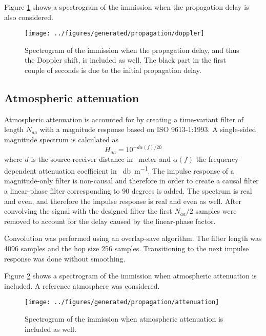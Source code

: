 Figure \ref{fig:implementation:propagation:doppler} shows a spectrogram of the immission when the propagation delay is also considered.

\begin{figure}[H]
  \centering
  \texttt{[image: ../figures/generated/propagation/doppler]}
  \caption{Spectrogram of the immission when the propagation delay, and thus the Doppler shift, is included as well. The black part in the first couple of seconds is due to the initial propagation delay.}
  \label{fig:implementation:propagation:doppler}
\end{figure}


\subsection{Atmospheric attenuation}
Atmospheric attenuation is accounted for by creating a time-variant filter of length $N_{aa}$
with a magnitude response based on ISO 9613-1:1993\cite{ISO9613-1}. A single-sided magnitude spectrum is calculated as
\begin{equation}
 H_{aa} = 10^{- d \alpha(f) / 20}
\end{equation}
where $d$ is the source-receiver distance in \SI{}{meter} and $\alpha(f)$ the
frequency-dependent attenuation coefficient in \SI{}{\decibel\per\meter}.
The impulse response of a magnitude-only filter is non-causal and therefore in
order to create a causal filter a linear-phase filter corresponding to 90
degrees is added. The spectrum is real and even, and therefore the impulse
response is real and even as well. After convolving the signal with the designed
filter the first $N_{aa}/2$ samples were removed to account for the delay caused
by the linear-phase factor.

Convolution was performed using an overlap-save algorithm. The filter length was
4096 samples and the hop size 256 samples. Transitioning to the next impulse
response was done without smoothing.

Figure \ref{fig:implementation:propagation:attenuation} shows a spectrogram of
the immission when atmospheric attenuation is included. A reference atmosphere
was considered.

\begin{figure}[H]
  \centering
  \texttt{[image: ../figures/generated/propagation/attenuation]}
  \caption{Spectrogram of the immission when atmospheric attenuation is included as well.}
  \label{fig:implementation:propagation:attenuation}
\end{figure}

